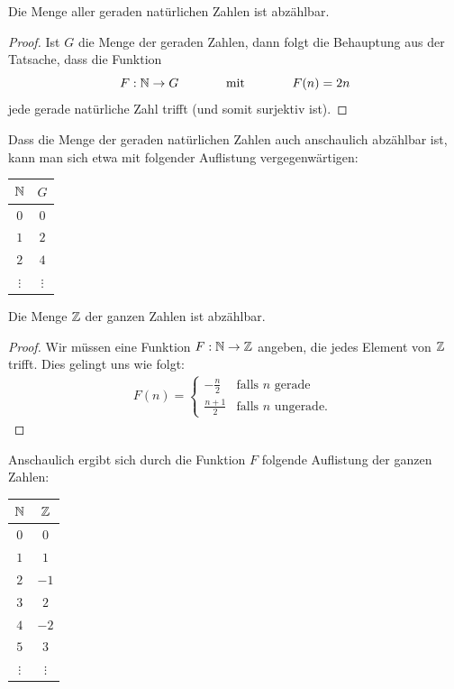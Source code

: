 \begin{bsp}
Die Menge aller geraden natürlichen Zahlen ist abzählbar.
\begin{proof}
Ist $G$ die Menge der geraden Zahlen, dann folgt die Behauptung aus der Tatsache, dass die Funktion
\[
F:\mathbb{N}\to G \phantom{abstand}\text{ mit }\phantom{abstand}F(n)=2n
\]
jede gerade natürliche Zahl trifft (und somit surjektiv ist).
\end{proof}
Dass die Menge der geraden natürlichen Zahlen auch anschaulich abzählbar ist, kann man sich etwa mit folgender Auflistung vergegenwärtigen:
\begin{center}
\begin{tabular}{c|c}
$\mathbb{N}$ & $G$\\
\hline
$0$ & $0$\\
$1$ & $2$\\
$2$ & $4$\\
$\vdots$ & $\vdots$
\end{tabular}
\end{center}
\end{bsp}

\begin{bsp}
Die Menge $\mathbb{Z}$ der ganzen Zahlen ist abzählbar.
\begin{proof}
Wir müssen eine Funktion $F:\mathbb{N}\to\mathbb{Z}$ angeben, die jedes Element von $\mathbb{Z}$ trifft. Dies gelingt uns wie folgt:
\begin{align*}
F(n)=\begin{cases}
-\frac{n}{2} &\text{falls $n$ gerade}\\
\frac{n+1}{2}&\text{falls $n$ ungerade. }
\end{cases}
\end{align*}
\end{proof}
Anschaulich ergibt sich durch die Funktion $F$ folgende Auflistung der ganzen Zahlen:
\begin{center}
\begin{tabular}{c|c}
$\mathbb{N}$ & $\mathbb{Z}$\\
\hline
$0$ & $0$\\
$1$ & $1$\\
$2$ & $-1$\\
$3$ & $2$\\
$4$ & $-2$\\
$5$ & $3$\\
$\vdots$ & $\vdots$
\end{tabular}
\end{center}
\end{bsp}

